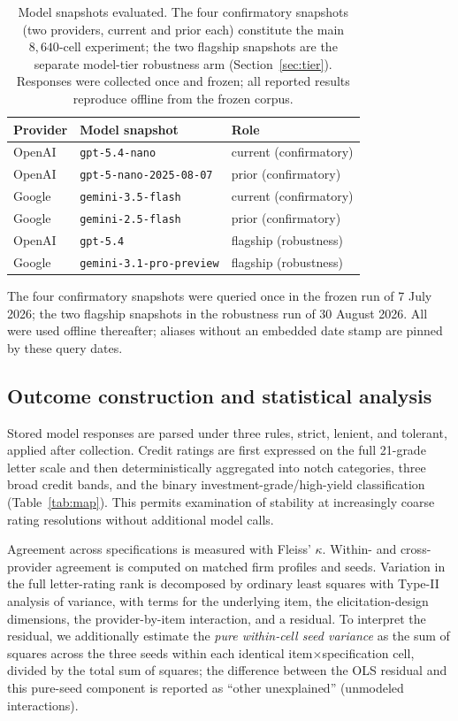 \documentclass[a4paper,fleqn]{cas-sc}
\begin{document}
\begin{table}[t]\centering
\caption{Model snapshots evaluated. The four confirmatory snapshots (two providers, current and prior
each) constitute the main $8{,}640$-cell experiment; the two flagship snapshots are the separate
model-tier robustness arm (Section~\ref{sec:tier}). Responses were collected once and frozen; all
reported results reproduce offline from the frozen corpus.}\label{tab:models}
\begin{tabular}{lll}\toprule
Provider & Model snapshot & Role \\\midrule
OpenAI & \texttt{gpt-5.4-nano} & current (confirmatory) \\
OpenAI & \texttt{gpt-5-nano-2025-08-07} & prior (confirmatory) \\
Google & \texttt{gemini-3.5-flash} & current (confirmatory) \\
Google & \texttt{gemini-2.5-flash} & prior (confirmatory) \\\midrule
OpenAI & \texttt{gpt-5.4} & flagship (robustness) \\
Google & \texttt{gemini-3.1-pro-preview} & flagship (robustness) \\\bottomrule
\end{tabular}

\vspace{3pt}
{\footnotesize\raggedright The four confirmatory snapshots were queried once in the frozen run of
7 July 2026; the two flagship snapshots in the robustness run of 30 August 2026. All were used offline
thereafter; aliases without an embedded date stamp are pinned by these query dates.\par}
\end{table}

\subsection{Outcome construction and statistical analysis}
Stored model responses are parsed under three rules, strict, lenient, and tolerant, applied after
collection. Credit ratings are first expressed on the full 21-grade letter scale and then
deterministically aggregated into notch categories, three broad credit bands, and the binary
investment-grade/high-yield classification (Table~\ref{tab:map}). This permits examination of stability at
increasingly coarse rating resolutions without additional model calls.

Agreement across specifications is measured with Fleiss' $\kappa$. Within- and cross-provider agreement
is computed on matched firm profiles and seeds. Variation in the full letter-rating rank is decomposed by
ordinary least squares with Type-II analysis of variance, with terms for the underlying item, the
elicitation-design dimensions, the provider-by-item interaction, and a residual. To interpret the
residual, we additionally estimate the \emph{pure within-cell seed variance} as the sum of squares across
the three seeds within each identical item$\times$specification cell, divided by the total sum of squares;
the difference between the OLS residual and this pure-seed component is reported as ``other unexplained''
(unmodeled interactions).
\end{document}
